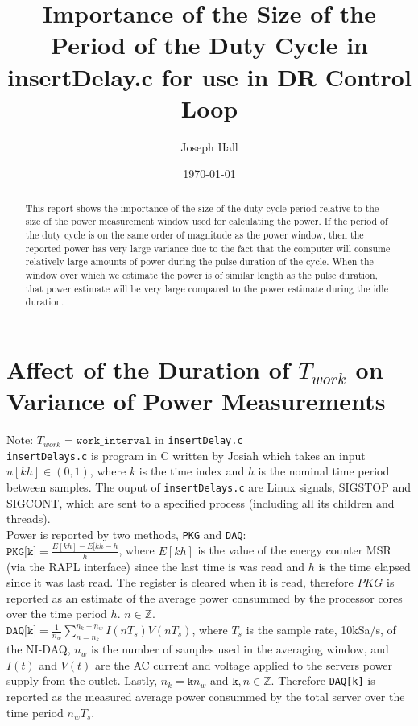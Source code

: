 \documentclass{article}
\begin{document}
\title{Importance of the Size of the Period of the Duty Cycle in insertDelay.c for use in DR Control Loop}
\author{Joseph Hall}
\date{\today}

\maketitle

\begin{abstract}
This report shows the importance of the size of the duty cycle period relative to the size of the power measurement window used for calculating the power.  If the period of the duty cycle is on the same order of magnitude as the power window, then the reported power has very large variance due to the fact that the computer will consume relatively large amounts of power during the pulse duration of the cycle.  When the window over which we estimate the power is of similar length as the pulse duration, that power estimate will be very large compared to the power estimate during the idle duration.
\end{abstract}

\section{Affect of the Duration of $T_{work}$ on Variance of Power Measurements}
Note: $T_{work}=\texttt{work\_interval}$ in \texttt{insertDelay.c} \\
\texttt{insertDelays.c} is program in C written by Josiah which takes an input $u[kh] \in (0, 1)$, where $k$ is the time index and $h$ is the nominal time period between samples.  The ouput of \texttt{insertDelays.c} are Linux signals, SIGSTOP and SIGCONT, which are sent to a specified process (including all its children and threads). \\
Power is reported by two methods, \texttt{PKG} and \texttt{DAQ}: \\

$\texttt{PKG[k]}=\frac{E[kh]-E[kh-h}{h}$, where $E[kh]$ is the value of the energy counter MSR (via the RAPL interface) since the last time is was read and $h$ is the time elapsed since it was last read.  The register is cleared when it is read, therefore $PKG$ is reported as an estimate of the average power consummed by the processor cores over the time period $h$.  $n \in \mathbb{Z}$.\\

$\texttt{DAQ[k]}=\frac{1}{n_{w}}\displaystyle\sum\limits_{n=n_k}^{n_k+n_{w}}I(nT_s)V(nT_s)$, where $T_s$ is the sample rate, 10kSa/s, of the NI-DAQ, $n_w$ is the number of samples used in the averaging window, and $I(t)$ and $V(t)$ are the AC current and voltage applied to the servers power supply from the outlet. Lastly, $n_k = \texttt{k}n_w$ and $\texttt{k},n \in \mathbb{Z}$.  Therefore \texttt{DAQ[k]} is reported as the measured average power consummed by the total server over the time period $n_wT_s$.
\end{document}
